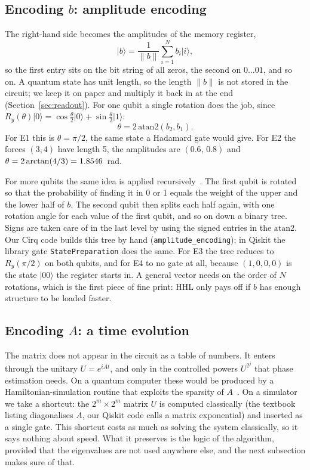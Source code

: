 \documentclass[manuscript,screen,review,nonacm]{acmart}
\newcommand{\ket}[1]{\lvert #1\rangle}
\newcommand{\norm}[1]{\lVert #1\rVert}
\newcommand{\code}[1]{\texttt{#1}}
\begin{document}
\subsection{Encoding \texorpdfstring{$b$}{b}: amplitude encoding}
\label{sec:encodingb}

The right-hand side becomes the amplitudes of the memory register,
\begin{equation}
  \ket{b}=\frac{1}{\norm{b}}\sum_{i=1}^{N} b_i\ket{i},
\end{equation}
so the first entry sits on the bit string of all zeros, the second on
$0\dots01$, and so on. A quantum state has unit length, so the length
$\norm{b}$ is not stored in the circuit; we keep it on paper and multiply it
back in at the end (Section~\ref{sec:readout}). For one qubit a single rotation
does the job, since
$R_y(\theta)\ket{0}=\cos\tfrac{\theta}{2}\ket{0}+\sin\tfrac{\theta}{2}\ket{1}$:
\begin{equation}
  \theta=2\,\mathrm{atan2}(b_2,b_1).
\end{equation}
For E1 this is $\theta=\pi/2$, the same state a Hadamard gate would give. For
E2 the forces $(3,4)$ have length 5, the amplitudes are $(0.6,\,0.8)$ and
$\theta=2\arctan(4/3)=1.8546$~rad.

For more qubits the same idea is applied recursively~\cite{mottonen2005,shende2006}.
The first qubit is rotated so that the probability of finding it in 0 or 1
equals the weight of the upper and the lower half of $b$. The second qubit
then splits each half again, with one rotation angle for each value of the
first qubit, and so on down a binary tree. Signs are taken care of in the last
level by using the signed entries in the $\mathrm{atan2}$. Our Cirq code
builds this tree by hand (\code{amplitude\_encoding}); in Qiskit the library
gate \code{StatePreparation} does the same. For E3 the tree reduces to
$R_y(\pi/2)$ on both qubits, and for E4 to no gate at all, because
$(1,0,0,0)$ is the state $\ket{00}$ the register starts in. A general vector
needs on the order of $N$ rotations, which is the first piece of fine print:
HHL only pays off if $b$ has enough structure to be loaded faster.

\subsection{Encoding \texorpdfstring{$A$}{A}: a time evolution}
\label{sec:encodingA}

The matrix does not appear in the circuit as a table of numbers. It enters
through the unitary $U=e^{iAt}$, and only in the controlled powers
$U^{2^j}$ that phase estimation needs. On a quantum computer these would be
produced by a Hamiltonian-simulation routine that exploits the sparsity of
$A$~\cite{lloyd1996,berry2007}. On a simulator we take a shortcut: the
$2^m\times 2^m$ matrix $U$ is computed classically (the textbook listing
diagonalises $A$, our Qiskit code calls a matrix exponential) and inserted as
a single gate. This shortcut costs as much as solving the system classically,
so it says nothing about speed. What it preserves is the logic of the
algorithm, provided that the eigenvalues are not used anywhere else, and the
next subsection makes sure of that.
\end{document}
